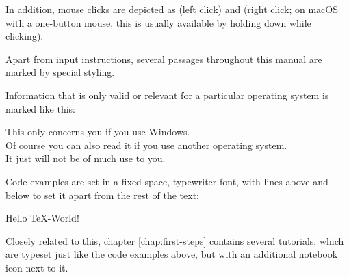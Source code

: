 In addition, mouse clicks are depicted as {\LMB} (left click) and {\RMB} (right click; on macOS with a one-button mouse, this is usually available by holding down {\Ctrl} while clicking).

Apart from input instructions, several passages throughout this manual are marked by special styling.

Information that is only valid or relevant for a particular operating system is marked like this:
\begin{OSWindows}
\noindent This only concerns you if you use Windows. \\
Of course you can also read it if you use another operating system. \\
It just will not be of much use to you.
\end{OSWindows}

\bigskip
Code examples are set in a fixed-space, typewriter font, with lines above and below to set it apart from the rest of the text:
\begin{verbExample}
Hello \TeX-World!
\end{verbExample}

Closely related to this, chapter \ref{chap:first-steps} contains several tutorials, which are typeset just like the code examples above, but with an additional notebook icon next to it.